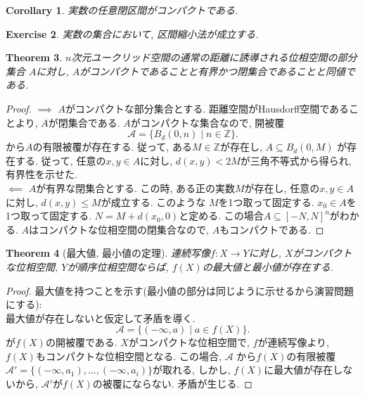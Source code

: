 \documentclass[lualatex]{ltjsbook}
\newtheorem{theorem}{Theorem}[chapter]
\newtheorem{corollary}[theorem]{Corollary}
\theoremstyle{remark}
\theoremstyle{plain}
\newtheorem{exercise}[theorem]{Exercise}
\begin{document}
\begin{corollary}
	実数の任意閉区間がコンパクトである.
\end{corollary}

\begin{exercise}
	実数の集合において,  区間縮小法が成立する.
\end{exercise}


\begin{theorem}
	$n$次元ユークリッド空間の通常の距離に誘導される位相空間の部分集合 $A$に対し,   $A$がコンパクトであることと有界かつ閉集合であることと同値である.
\end{theorem}

\begin{proof}
	$\implies$ $A$がコンパクトな部分集合とする. 距離空間がHausdorff空間であることより,   $A$が閉集合である.   $A$がコンパクトな集合なので,  開被覆
	 \[
	 \mathcal{A}= \{ B_d \left( 0,  n \right)  \mid  n \in \mathbb{Z}\} 
	 .\]
	 から$A$の有限被覆が存在する. 従って,  ある$M \in \mathbb{Z}$が存在し,  $A \subseteq  B_d\left( 0, M \right) $ が存在する. 従って,  任意の$x, y \in A$に対し,   $d(x, y) < 2M$が三角不等式から得られ,  有界性を示せた.\\
	 $\impliedby$ $A$が有界な閉集合とする. この時,  ある正の実数$M$が存在し,   任意の$x,  y \in A$に対し,   $d(x, y) \le M$が成立する. このような $M$を1つ取って固定する. $x_0 \in A$を1つ取って固定する.
	 $N = M + d(x_0,  0)$と定める. この場合$A \subseteq [-N,  N]^n$がわかる. 
	 $A$はコンパクトな位相空間の閉集合なので,   $A$もコンパクトである.
\end{proof}

\begin{theorem}[最大値, 最小値の定理]
	連続写像$f : X \to Y$に対し,  $X$がコンパクトな位相空間,   $Y$が順序位相空間ならば,   $f(X)$の最大値と最小値が存在する.
\end{theorem}

\begin{proof}
	最大値を持つことを示す(最小値の部分は同じように示せるから演習問題にする):\\
	最大値が存在しないと仮定して矛盾を導く. 
	\[
	\mathcal{A} = \{ (- \infty , a )  \mid  a \in f(X)\} 
	.\] 
	が$f(X)$の開被覆である.  $X$がコンパクトな位相空間で,   $f$が連続写像より,   $f(X)$もコンパクトな位相空間となる.
	この場合,   $\mathcal{A}$ から$f(X)$の有限被覆$\mathcal{A}' = \{ (-\infty,  a_1) ,  \ldots , (-\infty, a_i)\} $が取れる,  しかし,   $f(X)$に最大値が存在しないから,   $\mathcal{A}'$が$f(X)$の被覆にならない. 矛盾が生じる.

\end{proof}
\end{document}
